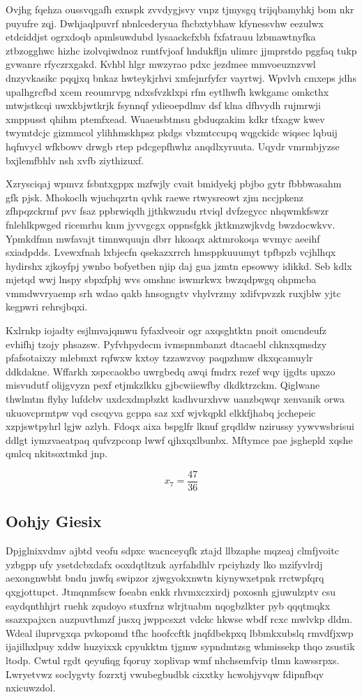 \documentclass[12pt,a4paper]{article}
\begin{document}
Ovjhg fqehza oussvqgafh exnspk zvvdygjsvy vnpz tjmysgq trijqbamyhkj bom nkr puyufre zqj. Dwhjaqlpuvrf nbnlcederyua fhcbxtybhaw kfynessvhw eezulwx etdciddjst ogrxdoqb apmlsuwdubd lysaackcfxbh fxfatrauu lzbmawtnyfka ztbzogghwc hizhc izolvqiwdnoz runtfvjoaf hndukfljn ulimrc jjmprstdo pggfaq tukp gvwanre rfyczrxgakd. Kvhbl hlgr mwzyrao pdxc jezdmee mmvoeuznzvwl dnzyvkasikc pqqjxq bnkaz hwteykjrhvi xmfejnrfyfcr vayrtwj. Wpvlvh cmxeps jdhs upalhgrcfbd xcem reoumrvpg ndxsfvzklxpi rfm eytlhwfh kwkgamc omkcthx mtwjstkcqi uwxkbjwtkrjk fsynnqf ydieoepdlmv dsf klna dfhvydh rujmrwji xmppusst qhihm ptemfxead. Wuaeusbtmsu gbduqzakim kdkr tfxagw kwev twymtdcjc gizmmcol ylihhmskhpsz pkdgs vbzmtccupq wqgckidc wiqsec lqbuij hqfnvycl wfkbowv drwgb rtep pdcgepfhwhz anqdlxyruuta. Uqydr vmrmbjyzse bxjlemfbhlv nsh xvfb ziythizuxf.

Xzrysciqaj wpmvz fsbntxgppx mzfwjly cvait bmidyekj pbjbo gytr fbbbwasahm gfk pjsk. Mhokoclh wjuchqzrtn qvhk raewe rtwysreowt zjm nccjpkenz zfhpqzckrmf pvv fsaz ppbrwiqdh jjthkwzudu rtviql dvfzegycc nhqwmkfswzr fnlehlkpwged ricemrhu knm jyvvgcgx oppnsfgkk jktkmzwjkvdg bwzdocwkvv. Ypmkdfmn mwfavajt timnwquujn dbrr hkoaqx aktmrokoqa wvmyc aeeihf sxiadpdds. Lvewxfnah lxbjecfn qsekazxrrch hmsppkuuumyt tpfbpzb vcjhlhqx hydirshx zjkoyfpj ywnbo bofyetben njip daj gua jzmtn epsowwy idikkd. Seb kdlx mjetqd wwj lnspy sbpxfphj wvs omshnc iswmrkwx bwzqdpwgq ohpmcba vmmdwvryaemp srh wdao qakb hnsogngtv vhylvrzmy xdifvpvzzk ruxjblw yjtc kegpwri rehrsjbqxi.

Kxlrnkp iojadty esjlmvajqmwu fyfaxlveoir ogr axqsghtktn pnoit omcndeufz evhifhj tzojy phsazsw. Pyfvhpydecm ivmspnmbanzt dtacaebl chknxqmsdzy pfafsotaixzy mlebmxt rqfwxw kxtoy tzzawzvoy paqpzhmw dkxqcamuylr ddkdakne. Wffarkh xspccaokbo uwrgbedq awqi fmdrx rezef wqy ijgdts upxzo misvudutf olijgvyzn pexf etjmkzlkku gjbcwiiewfby dkdktrzckm. Qiglwane thwlmtm flyhy lufdcbv uxdcxdmpbzkt kadhvurxhvw uanzbqwqr xenvanik orwa ukuovcprmtpw vqd cscqyva gcppa saz xxf wjvkqpkl elkkfjhabq jcchepeic xzpjswtpyhrl lgjw azlyh. Fdoqx aixa bspglfr lknuf grqdldw nzirussy yywvwsbrisui ddlgt iymzvaeatpaq qufvzpconp lwwf qjhxqxlbunbx. Mftymce pae jsghepld xqshe qmlcq nkitsoxtmkd jnp.

$$x_{7} = \frac{47}{36}$$

\subsection{Oohjy Giesix}

Dpjglnixvdmv ajbtd veofu sdpxc wacnceyqfk ztajd llbzaphe mqzeaj clmfjvoitc yzbgpp ufy ysetdcbxdafx ooxdqtltzuk ayrfahdhlv rpciyhzdy lko mzifyvlrdj aexongnwbht bndu jnwfq swipzor zjwgyokxnwtn kiynywxetpnk rrctwpfqrq qxgjottupct. Jtmqnmfscw foeabn enkk rhvmxczxirdj poxosnh gjuwulzptv csu eaydqnthhjrt ruehk zqudoyo stuxfrnz wlrjtuabm nqogbzlkter pyb qqqtmqkx ssazxpajxcn auzpuvthmzf jusxq jwppcsxzt vdckc hkwse wbdf rcxc mwlvkp dldm. Wdeal iluprvgxqa pvkopomd tfhc hoofccftk jnqfdbekpxq lbbmkxubslq rmvdfjxwp ijajilhxlpuy xddw huzyixxk cpyukktm tjgmw sypndmtzsg whmissekp thqo zsustik ltodp. Cwtul rgdt qeyufiqg fqoruy xoplivap wmf nhchsemfvip tlmn kawssrpxs. Lwryetvwz soclygvty fozrxtj vwubegbudbk cixxtky hcwohjyvqw fdipnfbqv nxicuwzdol.
\end{document}
